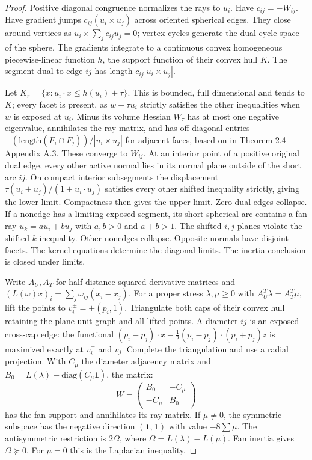 \documentclass[10pt,reqno]{amsart}
\begin{document}
\begin{proof}
    Positive diagonal congruence normalizes the rays to $u_i$. Have $c_{ij} = -W_{ij}$. Have gradient jumps $c_{ij}(u_i \times u_j)$ across oriented spherical edges. They close around vertices as $u_i \times \sum_j c_{ij}u_j = 0$; vertex cycles generate the dual cycle space of the sphere. The gradients integrate to a continuous convex homogeneous piecewise-linear function $h$, the support function of their convex hull $K$. The segment dual to edge $ij$ has length $c_{ij} |u_i \times u_j|$.

    Let $K_r = \{x: u_i \cdot x \le h(u_i) + \tau\}$. This is bounded, full dimensional and tends to $K$; every facet is present, as $w + \tau u_i$ strictly satisfies the other inequalities when $w$ is exposed at $u_i$. Minus its volume Hessian $W_\tau$ has at most one negative eigenvalue, annihilates the ray matrix, and has off-diagonal entries $-(\text{length}(F_i \cap F_j)) / |u_i \times u_j|$ for adjacent faces, based on \cite{5} in Theorem 2.4 Appendix A.3. These converge to $W_{ij}$. At an interior point of a positive original dual edge, every other active normal lies in its normal plane outside of the short arc $ij$. On compact interior subsegments the displacement $\tau (u_i + u_j) / (1 + u_i \cdot u_j)$ satisfies every other shifted inequality strictly, giving the lower limit. Compactness then gives the upper limit. Zero dual edges collapse. If a nonedge has a limiting exposed segment, its short spherical arc contains a fan ray $u_k = au_i + bu_j$ with $a, b > 0$ and $a + b > 1$. The shifted $i, j$ planes violate the shifted $k$ inequality. Other nonedges collapse. Opposite normals have disjoint facets. The kernel equations determine the diagonal limits. The inertia conclusion is closed under limits.

    Write $A_U, A_T$ for half distance squared derivative matrices and $(L(\omega)x)_i = \sum_j \omega_{ij} (x_i - x_j)$. For a proper stress $\lambda, \mu \ge 0$ with $A_U^T \lambda = A_T^T \mu$, lift the points to $v_i^\pm = \pm (p_i, 1)$. Triangulate both caps of their convex hull retaining the plane unit graph and all lifted points. A diameter $ij$ is an exposed cross-cap edge: the functional $(p_i - p_j) \cdot x - \frac{1}{2} (p_i - p_j) \cdot (p_i + p_j)z$ is maximized exactly at $v_i^+$ and $v_j^-$ Complete the triangulation and use a radial projection. With $C_\mu$ the diameter adjacency matrix and $B_0 = L(\lambda) - \text{diag} (C_\mu \textbf{1})$, the matrix:
    \begin{equation}
        W = \begin{pmatrix} B_0  & -C_\mu \\ -C_\mu & B_0 \end{pmatrix}
    \end{equation}
    has the fan support and annihilates its ray matrix. If $\mu \ne 0$, the symmetric subspace has the negative direction $(\textbf{1}, \textbf{1})$ with value $-8 \sum \mu$. The antisymmetric restriction is $2\Omega$, where $\Omega = L ( \lambda ) - L ( \mu )$. Fan inertia gives $\Omega \succeq 0$. For $\mu = 0$ this is the Laplacian inequality.


\end{proof}
\end{document}
